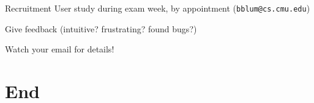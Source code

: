 \documentclass[xcolor=dvipsnames]{beamer}
\begin{document}
\begin{frame}{Recruitment}
	User study during exam week, by appointment (\texttt{bblum@cs.cmu.edu})
	\linegap

%

	Give feedback (intuitive? frustrating? found bugs?)

	\linegap
	Watch your email for details!
\end{frame}


\section{End}

\end{document}
